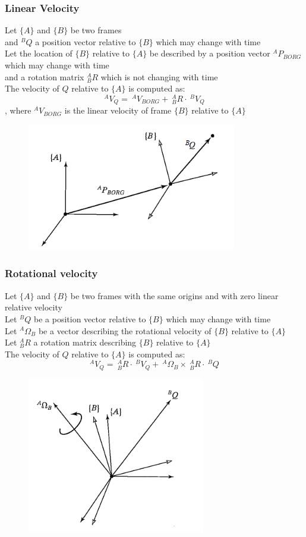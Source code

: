 \documentclass[10pt,a4paper]{article}
\begin{document}
\subsubsection{Linear Velocity}
Let $\{A\}$ and $\{B\}$ be two frames \\
and $^BQ$ a position vector relative to $\{B\}$ which may change with time \\
Let the location of $\{B\}$ relative to $\{A\}$ be described by a position vector $^AP_{BORG}$ which may change with time \\
and a rotation matrix $^A_BR$ which is not changing with time \\
The velocity of $Q$ relative to $\{A\}$ is computed as: \\
$$
	^AV_Q = ~^AV_{BORG} + ~^A_BR⋅ ~^BV_Q
$$
, where $^AV_{BORG}$ is the linear velocity of frame $\{B\}$ relative to $\{A\}$

\begin{figure}[H]
	\includegraphics[width=0.5\columnwidth]{imgs/velocity_trans.png}
\end{figure}

\subsubsection{Rotational velocity}
Let $\{A\}$ and $\{B\}$ be two frames with the same origins and with zero linear relative velocity \\
Let $^BQ$ be a position vector relative to $\{B\}$ which may change with time \\
Let $^A\Omega_B$ be a vector describing the rotational velocity of $\{B\}$ relative to $\{A\}$ \\
Let $^A_BR$ a rotation matrix describing $\{B\}$ relative to $\{A\}$ \\
The velocity of $Q$ relative to $\{A\}$ is computed as: \\
$$
	^AV_Q = ~^A_BR ⋅~^BV_Q + ~^A\Omega_B \times ~^A_BR ⋅ ~^BQ
$$

\begin{figure}[H]
	\includegraphics[width=0.5\columnwidth]{imgs/velocity_rot.png}
\end{figure}
\end{document}
